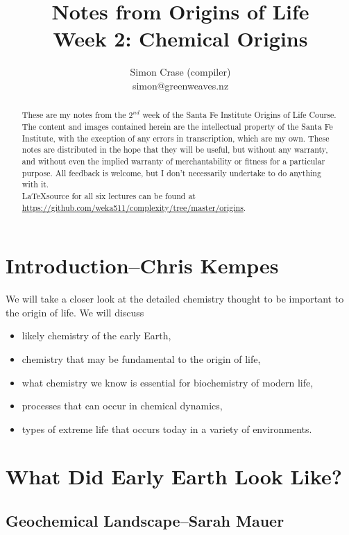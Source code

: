 \documentclass[]{article}
\title{
	Notes from Origins of Life\\
	Week 2: Chemical Origins
}
\author{Simon Crase (compiler)\\simon@greenweaves.nz}
\begin{document}
\maketitle

\begin{abstract}
   These are my notes from the $2^{nd}$ week of the Santa Fe Institute Origins of Life Course\cite{sfi2020}. 
   The content and images contained herein are the intellectual property of the Santa Fe Institute, with the exception of any errors in transcription, which are my own.
   These notes are distributed in the hope that they will be useful,
   but without any warranty, and without even the implied warranty of
   merchantability or fitness for a particular purpose. All feedback is welcome,
   but I don't necessarily undertake to do anything with it.\\
   \LaTeX source for all six lectures can be found at\\
   \url{https://github.com/weka511/complexity/tree/master/origins}.
\end{abstract}

\setcounter{tocdepth}{2}
\tableofcontents
\listoffigures

\section[Introduction]{Introduction--Chris Kempes}

We will take a closer look at the detailed chemistry thought to be important to the origin of life. We will discuss
\begin{itemize}
	\item likely chemistry of the early Earth,
	\item chemistry that may be  fundamental to the origin of life,
	\item what chemistry we know is essential for biochemistry of modern life,
	\item processes that can occur in chemical dynamics, 
	\item types of extreme life that occurs today in a variety of environments.
\end{itemize}


\section{What Did Early Earth Look Like?}

\subsection[Geochemical Landscape]{Geochemical Landscape--Sarah Mauer}
\end{document}
